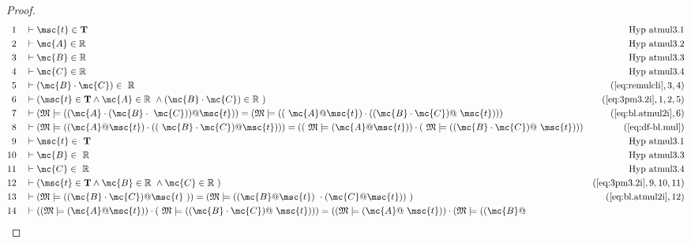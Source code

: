 \begin{proof}
\begin{align}
  1 &&  & \vdash \msc{t} \in \mathbf{T}&\text{Hyp~atmul3.1}\notag%
  \\ 2 &&  & \vdash \mc{A} \in \mathbb{R}&\text{Hyp~atmul3.2}\notag%
  \\ 3 &&  & \vdash \mc{B} \in \mathbb{R}&\text{Hyp~atmul3.3}\notag%
  \\ 4 &&  & \vdash \mc{C} \in \mathbb{R}&\text{Hyp~atmul3.4}\notag%
  \\ 5 &&  & \vdash ( \mc{B} \cdot \mc{C} ) \in
     ~\mathbb{R}&(\mbox{\ref{eq:remulcli}},3,4)\notag
  \\ 6 &&  & \vdash ( \msc{t} \in \mathbf{T} \wedge \mc{A} \in \mathbb{R}
     ~\wedge ( \mc{B} \cdot \mc{C} ) \in \mathbb{R}
     ~)&(\mbox{\ref{eq:3pm3.2i}},1,2,5)\notag
  \\ 7 &&  & \vdash ( \mathfrak{M} \models ( ( \mc{A} \cdot ( \mc{B} \cdot
     ~\mc{C} ) ) @ \msc{t} ) ) = ( \mathfrak{M} \models ( (
     ~\mc{A} @ \msc{t} ) \cdot ( ( \mc{B} \cdot \mc{C} ) @
     ~\msc{t} ) ) )&(\mbox{\ref{eq:bl.atmul2i}},6)\notag
  \\ 8 &&  & \vdash ( \mathfrak{M} \models ( ( \mc{A} @ \msc{t} ) \cdot ( (
     ~\mc{B} \cdot \mc{C} ) @ \msc{t} ) ) ) = ( (
     ~\mathfrak{M} \models ( \mc{A} @ \msc{t} ) ) \cdot (
     ~\mathfrak{M} \models ( ( \mc{B} \cdot \mc{C} ) @
     ~\msc{t} ) ) )&(\mbox{\ref{eq:df-bl.mul}})\notag
  \\ 9 &&  & \vdash \msc{t} \in
     ~\mathbf{T}&\text{Hyp~atmul3.1}\notag%
  \\ 10 &&  & \vdash \mc{B} \in
     ~\mathbb{R}&\text{Hyp~atmul3.3}\notag%
  \\ 11 &&  & \vdash \mc{C} \in
     ~\mathbb{R}&\text{Hyp~atmul3.4}\notag%
  \\ 12 &&  & \vdash ( \msc{t} \in \mathbf{T} \wedge \mc{B} \in \mathbb{R}
     ~\wedge \mc{C} \in \mathbb{R}
     ~)&(\mbox{\ref{eq:3pm3.2i}},9,10,11)\notag
  \\ 13 &&  & \vdash ( \mathfrak{M} \models ( ( \mc{B} \cdot \mc{C} ) @ \msc{t}
     ~) ) = ( \mathfrak{M} \models ( ( \mc{B} @ \msc{t} )
     ~\cdot ( \mc{C} @ \msc{t} ) )
     ~)&(\mbox{\ref{eq:bl.atmul2i}},12)\notag
  \\ 14 &&  & \vdash ( ( \mathfrak{M} \models ( \mc{A} @ \msc{t} ) ) \cdot (
     ~\mathfrak{M} \models ( ( \mc{B} \cdot \mc{C} ) @
     ~\msc{t} ) ) ) = ( ( \mathfrak{M} \models ( \mc{A} @
     ~\msc{t} ) ) \cdot ( \mathfrak{M} \models ( ( \mc{B} @

\end{align}
\end{proof}
